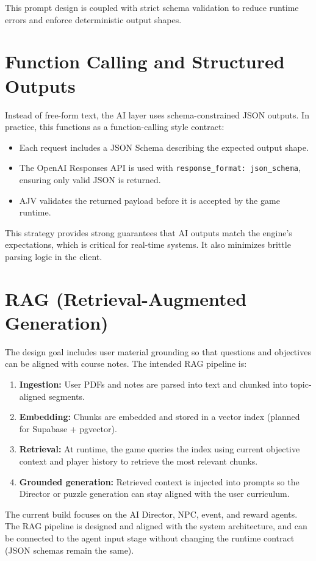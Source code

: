 \documentclass[12pt]{article}
\begin{document}
This prompt design is coupled with strict schema validation to reduce runtime errors and enforce deterministic output shapes.

\section*{Function Calling and Structured Outputs}
Instead of free-form text, the AI layer uses schema-constrained JSON outputs. In practice, this functions as a function-calling style contract:
\begin{itemize}[leftmargin=1.1em]
  \item Each request includes a JSON Schema describing the expected output shape.
  \item The OpenAI Responses API is used with \texttt{response\_format: json\_schema}, ensuring only valid JSON is returned.
  \item AJV validates the returned payload before it is accepted by the game runtime.
\end{itemize}

This strategy provides strong guarantees that AI outputs match the engine's expectations, which is critical for real-time systems. It also minimizes brittle parsing logic in the client.

\section*{RAG (Retrieval-Augmented Generation)}
The design goal includes user material grounding so that questions and objectives can be aligned with course notes. The intended RAG pipeline is:
\begin{enumerate}[leftmargin=1.1em]
  \item \textbf{Ingestion:} User PDFs and notes are parsed into text and chunked into topic-aligned segments.
  \item \textbf{Embedding:} Chunks are embedded and stored in a vector index (planned for Supabase + pgvector).
  \item \textbf{Retrieval:} At runtime, the game queries the index using current objective context and player history to retrieve the most relevant chunks.
  \item \textbf{Grounded generation:} Retrieved context is injected into prompts so the Director or puzzle generation can stay aligned with the user curriculum.
\end{enumerate}

The current build focuses on the AI Director, NPC, event, and reward agents. The RAG pipeline is designed and aligned with the system architecture, and can be connected to the agent input stage without changing the runtime contract (JSON schemas remain the same).
\end{document}
